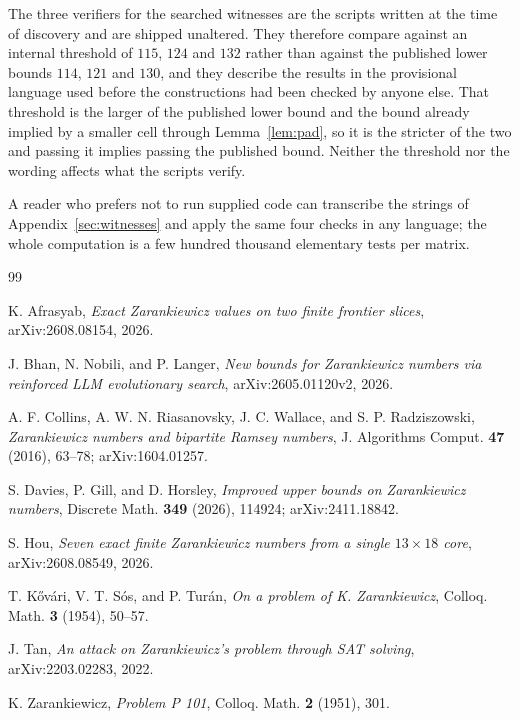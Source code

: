 \documentclass[11pt,reqno]{amsart}
\theoremstyle{plain}
\theoremstyle{remark}
\begin{document}
The three verifiers for the searched witnesses are the scripts written at the time of discovery and
are shipped unaltered. They therefore compare against an internal threshold of $115$, $124$ and
$132$ rather than against the published lower bounds $114$, $121$ and $130$, and they describe the
results in the provisional language used before the constructions had been checked by anyone else.
That threshold is the larger of the published lower bound and the bound already implied by a smaller
cell through Lemma~\ref{lem:pad}, so it is the stricter of the two and passing it implies passing the
published bound. Neither the threshold nor the wording affects what the scripts verify.

A reader who prefers not to run supplied code can transcribe the strings of
Appendix~\ref{sec:witnesses} and apply the same four checks in any language; the whole computation is
a few hundred thousand elementary tests per matrix.

\begin{thebibliography}{99}

K. Afrasyab,
\emph{Exact Zarankiewicz values on two finite frontier slices},
arXiv:2608.08154, 2026.

J. Bhan, N. Nobili, and P. Langer,
\emph{New bounds for Zarankiewicz numbers via reinforced LLM evolutionary search},
arXiv:2605.01120v2, 2026.

A. F. Collins, A. W. N. Riasanovsky, J. C. Wallace, and S. P. Radziszowski,
\emph{Zarankiewicz numbers and bipartite Ramsey numbers},
J. Algorithms Comput. \textbf{47} (2016), 63--78; arXiv:1604.01257.

S. Davies, P. Gill, and D. Horsley,
\emph{Improved upper bounds on Zarankiewicz numbers},
Discrete Math. \textbf{349} (2026), 114924; arXiv:2411.18842.

S. Hou,
\emph{Seven exact finite Zarankiewicz numbers from a single $13\times 18$ core},
arXiv:2608.08549, 2026.

T. K\H{o}v\'ari, V. T. S\'os, and P. Tur\'an,
\emph{On a problem of K. Zarankiewicz},
Colloq. Math. \textbf{3} (1954), 50--57.

J. Tan,
\emph{An attack on Zarankiewicz's problem through SAT solving},
arXiv:2203.02283, 2022.

K. Zarankiewicz,
\emph{Problem P 101},
Colloq. Math. \textbf{2} (1951), 301.

\end{thebibliography}
\end{document}

